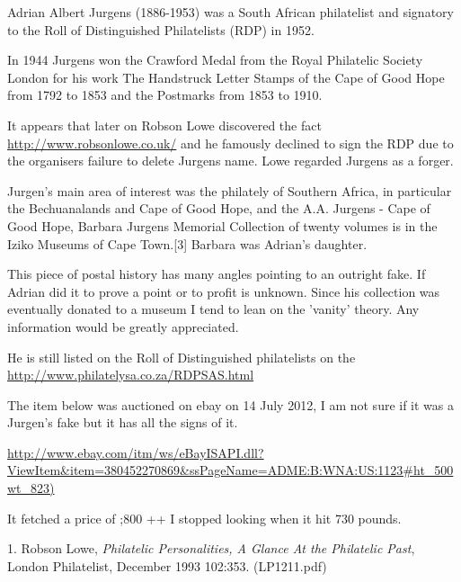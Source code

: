  
Adrian Albert Jurgens (1886-1953) was a South African 
philatelist and signatory to the Roll of Distinguished 
Philatelists (RDP) in 1952.

In 1944 Jurgens won the Crawford Medal from the Royal 
Philatelic Society London for his work The Handstruck Letter 
Stamps of the Cape of Good Hope from 1792 to 1853 and the 
Postmarks from 1853 to 1910.


It appears that later on Robson Lowe discovered the 
fact \url{http://www.robsonlowe.co.uk/} and he famously declined 
to sign the RDP due to the organisers failure to 
delete Jurgens name. Lowe regarded Jurgens as a forger. 

Jurgen's main area of interest was the philately of 
Southern Africa, in particular the Bechuanalands and 
Cape of Good Hope, and the A.A. Jurgens - Cape of 
Good Hope, Barbara Jurgens Memorial Collection of 
twenty volumes is in the Iziko Museums of Cape Town.[3] 
Barbara was Adrian's daughter.

This piece of postal history has many angles pointing 
to an outright fake. If Adrian did it to prove a point 
or to profit is unknown. Since his collection was eventually
donated to a museum I tend to lean on the 'vanity' theory. 
Any information would be greatly appreciated.

He is still listed on the Roll of Distinguished 
philatelists on the \href{Philatelic Federation of 
South Africa (1948).}{http://www.philatelysa.co.za/RDPSAS.html}

The item below was auctioned on ebay on 14 July 2012, I am not sure 
if it was a Jurgen's fake but it has all the signs of it. 

\url{http://www.ebay.com/itm/ws/eBayISAPI.dll?ViewItem&item=380452270869&ssPageName=ADME:B:WNA:US:1123\#ht_500wt_823)}

It fetched a price of \pound;800 ++ I stopped looking when it hit 730 pounds.





1. Robson Lowe, \textit{Philatelic Personalities, A Glance At the Philatelic Past},
London Philatelist, December 1993 102:353. (LP1211.pdf)
 
 

                        